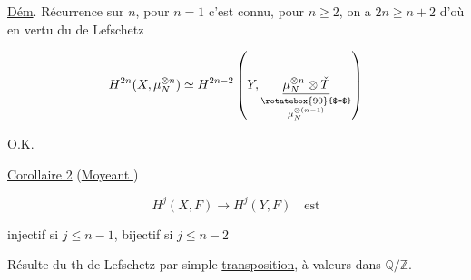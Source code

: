 
\uline{Dém}. Récurrence sur $n$, pour  $n=1$
c'est connu, pour $n\geq 2$, on a 
$2n\geq n+2$ d'où en vertu du  de
Lefschetz

\[
H^{2n}(X,\mu_N^{\otimes n})\simeq H^{2n-2}
\left(Y,\underset{\substack{\rotatebox{90}{$=$}\\ \mu_N^{\otimes(n-1)}}}{\underline{\mu_N^{\otimes n}\otimes\check T}}\right)
\]

O.K.

\uline{Corollaire 2} \quad (\uline{Moye}\uline{ant })

\[ H^j(X,F)\longrightarrow H^j(Y,F) \quad\text{est} \]

injectif si $j\leq n-1$, bijectif si $j\leq n-2$

Résulte du th de Lefschetz par
simple \uline{transposition}, à valeurs dans $\mathbb Q/\mathbb Z$.

